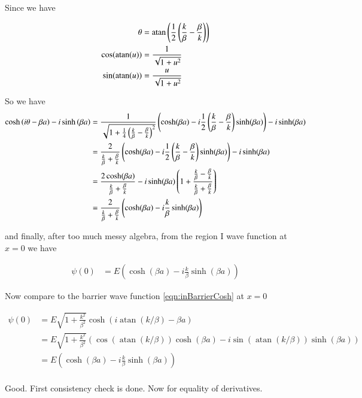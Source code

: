 \documentclass{article}
\DeclareMathOperator{\atan}{atan}
\begin{document}
Since we have

\begin{align*}
\theta &= \atan\left( \inv{2} \left(\frac{k}{\beta} - \frac{\beta}{k} \right) \right) \\
\cos(\atan(u)) &= \inv{\sqrt{1 + u^2}} \\
\sin(\atan(u)) &= \frac{u}{\sqrt{1 + u^2}} \\
\end{align*}

So we have
\begin{align*}
\cosh\left( i\theta -\beta a \right) -i \sinh\left( \beta a \right) 
&=
\frac{1}{\sqrt{1 + \frac{1}{4} \left(\frac{k}{\beta} - \frac{\beta}{k} \right)^2}}
\left(\cosh(\beta a ) 
-i
\frac{1}{2} \left(\frac{k}{\beta} - \frac{\beta}{k} \right) \sinh(\beta a ) \right)
-i \sinh( \beta a ) \\
&=
\frac{2}{\frac{k}{\beta} + \frac{\beta}{k} }
\left(\cosh(\beta a ) 
-i
\frac{1}{2} \left(\frac{k}{\beta} - \frac{\beta}{k} \right) \sinh(\beta a ) \right)
-i \sinh( \beta a )  \\
&=
\frac{ 2 \cosh(\beta a ) }{\frac{k}{\beta} + \frac{\beta}{k} }
-i \sinh( \beta a ) \left( 1 + \frac{\frac{k}{\beta} - \frac{\beta}{k}}{ \frac{k}{\beta} + \frac{\beta}{k}} \right) \\
&=
\frac{ 2 }{\frac{k}{\beta} + \frac{\beta}{k} }
\left(
\cosh(\beta a ) - i \frac{k}{\beta}\sinh( \beta a ) 
\right)
\end{align*}

and finally, after too much messy algebra, from the region I wave function at $x=0$ we have

\begin{align*}
\psi(0) &= E \left( \cosh(\beta a ) - i \frac{k}{\beta}\sinh( \beta a )  \right)
\end{align*}

Now compare to the barrier wave function \ref{eqn:inBarrierCosh} at $x=0$

\begin{align*}
\psi(0) 
&= E \sqrt{1 + \frac{k^2}{\beta^2}} \cosh\left( i\atan(k/\beta) - \beta a \right)  \\
&= E \sqrt{1 + \frac{k^2}{\beta^2}} 
\left(
\cos(\atan(k/\beta))\cosh(\beta a)
-i\sin(\atan(k/\beta))\sinh(\beta a)
\right) \\
&= E 
\left(
\cosh(\beta a)
-i\frac{k}{\beta} \sinh(\beta a)
\right) \\
\end{align*}

Good.  First consistency check is done.  Now for equality of derivatives.
\end{document}
